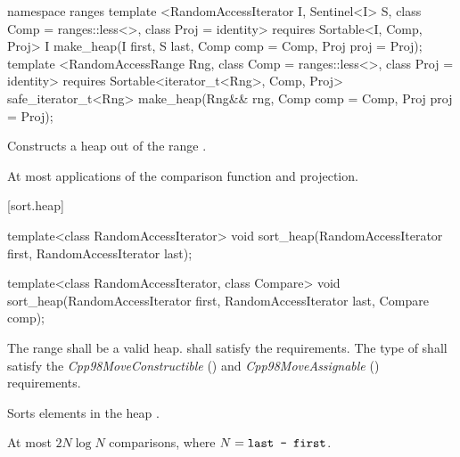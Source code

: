 \begin{addedblock}
%
\begin{itemdecl}
namespace ranges {
  template <RandomAccessIterator I, Sentinel<I> S, class Comp = ranges::less<>,
            class Proj = identity>
      requires Sortable<I, Comp, Proj>
    I make_heap(I first, S last, Comp comp = Comp{}, Proj proj = Proj{});
  template <RandomAccessRange Rng, class Comp = ranges::less<>, class Proj = identity>
      requires Sortable<iterator_t<Rng>, Comp, Proj>
    safe_iterator_t<Rng> make_heap(Rng&& rng, Comp comp = Comp{}, Proj proj = Proj{});
}
\end{itemdecl}

\begin{itemdescr}
\pnum
\effects
Constructs a heap out of the range
.

\pnum
\returns {}

\pnum
\complexity
At most
applications of the comparison function and projection.
\end{itemdescr}
\end{addedblock}

[sort.heap]{}

%
\begin{itemdecl}
template<class RandomAccessIterator>
  void sort_heap(RandomAccessIterator first, RandomAccessIterator last);

template<class RandomAccessIterator, class Compare>
  void sort_heap(RandomAccessIterator first, RandomAccessIterator last,
                 Compare comp);
\end{itemdecl}

\begin{itemdescr}
\pnum
\requires The range  shall be a valid heap.
 shall satisfy the
 requirements. The type
of  shall satisfy the
\textit{Cpp98MoveConstructible} () and
\textit{Cpp98MoveAssignable} () requirements.

\pnum
\effects
Sorts elements in the heap
.

\pnum
\complexity
At most $2N \log N$
comparisons, where
$N = \texttt{last - first}$.
\end{itemdescr}

